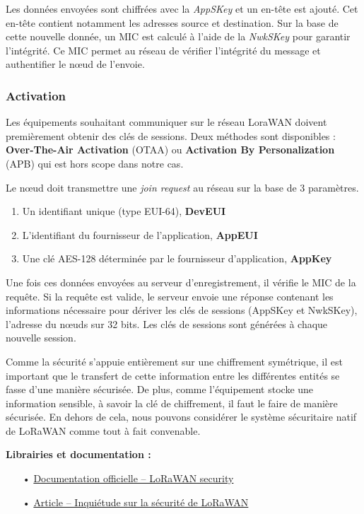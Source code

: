Les données envoyées sont chiffrées avec la \emph{AppSKey} et un en-tête est ajouté. Cet en-tête contient notamment les adresses source et destination. Sur la base de cette nouvelle donnée, un MIC est calculé à l'aide de la \emph{NwkSKey}  pour garantir l'intégrité. Ce MIC permet au réseau de vérifier l'intégrité du message et authentifier le nœud de l'envoie.

\subsubsection{Activation}

Les équipements souhaitant communiquer sur le réseau LoraWAN doivent premièrement obtenir des clés de sessions. Deux méthodes sont disponibles : \textbf{Over-The-Air Activation} (OTAA) ou \textbf{Activation By Personalization} (APB) qui est hors scope dans notre cas.

Le nœud doit transmettre une \emph{join request} au réseau sur la base de 3 paramètres.
\begin{enumerate}
\item Un identifiant unique (type EUI-64), \textbf{DevEUI}
\item L'identifiant du fournisseur de l'application, \textbf{AppEUI}
\item Une clé AES-128 déterminée par le fournisseur d'application, \textbf{AppKey}
\end{enumerate}
\vspace{3mm}

Une fois ces données envoyées au serveur d'enregistrement, il vérifie le MIC de la requête. Si la requête est valide, le serveur envoie une réponse contenant les informations nécessaire pour dériver les clés de sessions (AppSKey et NwkSKey), l'adresse du nœuds sur 32 bits. Les clés de sessions sont générées à chaque nouvelle session.

Comme la sécurité s'appuie entièrement sur une chiffrement symétrique, il est important que le transfert de cette information entre les différentes entités se fasse d'une manière sécurisée. De plus, comme l'équipement stocke une information sensible, à savoir la clé de chiffrement, il faut le faire de manière sécurisée. En dehors de cela, nous pouvons considérer le système sécuritaire natif de LoRaWAN comme tout à fait convenable.

\medskip
\textbf{Librairies et documentation :}

\begin{itemize}
\item[•] \href{https://www.thethingsnetwork.org/docs/lorawan/security.html}{Documentation officielle -- LoRaWAN security}
\item[•] \href{http://simfonymobile.com/blog/Should-you-worry-about-LoRaWAN-security/}{Article -- Inquiétude sur la sécurité de LoRaWAN}
\end{itemize}

